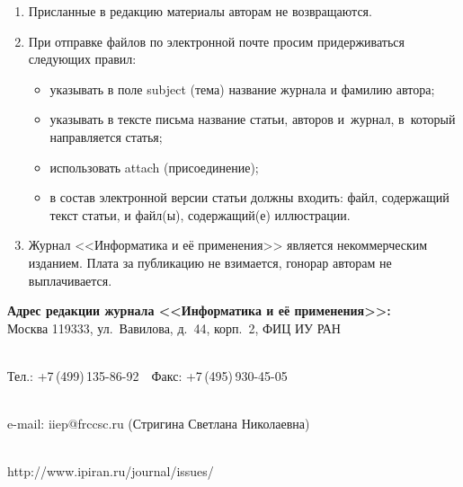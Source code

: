 {\begin{enumerate}[1.]
\item Присланные в редакцию материалы авторам не возвращаются.\\[-13.5pt]

\item При отправке файлов по электронной почте просим придерживаться следующих
правил:
\begin{itemize}
\item указывать в поле subject (тема) название журнала и фамилию автора;\\[-13.5pt]
\item указывать в тексте письма название статьи, авторов и~журнал, в~который направляется статья;\\[-13.5pt]
\item использовать attach (присоединение);\\[-13.5pt]
\item в состав электронной версии статьи должны входить: файл, содержащий текст
статьи, и файл(ы), содержащий(е) иллюстрации.\\[-13.5pt]
\end{itemize}

\item Журнал <<Информатика и её применения>> является некоммерческим изданием.
Плата за публикацию не взимается, гонорар авторам не выплачивается.
\end{enumerate}



\def\leftfootline{\small{\textbf{\thepage}
\hfill ИНФОРМАТИКА И ЕЁ ПРИМЕНЕНИЯ\ \ \ том\ 18\ \ \ выпуск\ 1\ \ \ 2024}
}%
 \def\rightfootline{\small{ИНФОРМАТИКА И ЕЁ ПРИМЕНЕНИЯ\ \ \ том\ 18\ \ \ выпуск\ 1\ \ \ 2024
\hfill \textbf{\thepage}}}


\vspace*{-1mm}

\begin{center}

\textbf{Адрес редакции журнала <<Информатика и её применения>>:} \\




Москва 119333, ул.~Вавилова, д.~44, корп.~2, ФИЦ ИУ РАН\\[-10pt]

\

Тел.: +7\,(499)\,135-86-92\ \ Факс:  +7\,(495)\,930-45-05\\[-10pt]

 \

e-mail:   {\sf iiep@frccsc.ru} (Стригина Светлана Николаевна)\\[-10pt]

\

{\sf http://www.ipiran.ru/journal/issues/}
\end{center}
}


